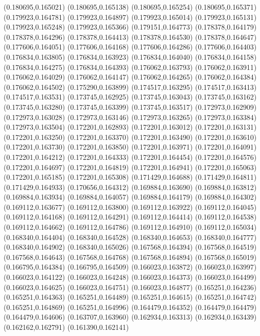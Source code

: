 (0.180695,0.165021)
(0.180695,0.165138)
(0.180695,0.165254)
(0.180695,0.165371)
(0.179923,0.164781)
(0.179923,0.164897)
(0.179923,0.165014)
(0.179923,0.165131)
(0.179923,0.165248)
(0.179923,0.165366)
(0.179151,0.164773)
(0.178378,0.164179)
(0.178378,0.164296)
(0.178378,0.164413)
(0.178378,0.164530)
(0.178378,0.164647)
(0.177606,0.164051)
(0.177606,0.164168)
(0.177606,0.164286)
(0.177606,0.164403)
(0.176834,0.163805)
(0.176834,0.163923)
(0.176834,0.164040)
(0.176834,0.164158)
(0.176834,0.164275)
(0.176834,0.164393)
(0.176062,0.163793)
(0.176062,0.163911)
(0.176062,0.164029)
(0.176062,0.164147)
(0.176062,0.164265)
(0.176062,0.164384)
(0.176062,0.164502)
(0.175290,0.163899)
(0.174517,0.163295)
(0.174517,0.163413)
(0.174517,0.163531)
(0.173745,0.162925)
(0.173745,0.163043)
(0.173745,0.163162)
(0.173745,0.163280)
(0.173745,0.163399)
(0.173745,0.163517)
(0.172973,0.162909)
(0.172973,0.163028)
(0.172973,0.163146)
(0.172973,0.163265)
(0.172973,0.163384)
(0.172973,0.163504)
(0.172201,0.162893)
(0.172201,0.163012)
(0.172201,0.163131)
(0.172201,0.163250)
(0.172201,0.163370)
(0.172201,0.163490)
(0.172201,0.163610)
(0.172201,0.163730)
(0.172201,0.163850)
(0.172201,0.163971)
(0.172201,0.164091)
(0.172201,0.164212)
(0.172201,0.164333)
(0.172201,0.164454)
(0.172201,0.164576)
(0.172201,0.164697)
(0.172201,0.164819)
(0.172201,0.164941)
(0.172201,0.165063)
(0.172201,0.165185)
(0.172201,0.165308)
(0.171429,0.164688)
(0.171429,0.164811)
(0.171429,0.164933)
(0.170656,0.164312)
(0.169884,0.163690)
(0.169884,0.163812)
(0.169884,0.163934)
(0.169884,0.164057)
(0.169884,0.164179)
(0.169884,0.164302)
(0.169112,0.163677)
(0.169112,0.163800)
(0.169112,0.163922)
(0.169112,0.164045)
(0.169112,0.164168)
(0.169112,0.164291)
(0.169112,0.164414)
(0.169112,0.164538)
(0.169112,0.164662)
(0.169112,0.164786)
(0.169112,0.164910)
(0.169112,0.165034)
(0.168340,0.164404)
(0.168340,0.164528)
(0.168340,0.164653)
(0.168340,0.164777)
(0.168340,0.164902)
(0.168340,0.165026)
(0.167568,0.164394)
(0.167568,0.164519)
(0.167568,0.164643)
(0.167568,0.164768)
(0.167568,0.164894)
(0.167568,0.165019)
(0.166795,0.164384)
(0.166795,0.164509)
(0.166023,0.163872)
(0.166023,0.163997)
(0.166023,0.164122)
(0.166023,0.164248)
(0.166023,0.164373)
(0.166023,0.164499)
(0.166023,0.164625)
(0.166023,0.164751)
(0.166023,0.164877)
(0.165251,0.164236)
(0.165251,0.164363)
(0.165251,0.164489)
(0.165251,0.164615)
(0.165251,0.164742)
(0.165251,0.164869)
(0.165251,0.164996)
(0.164479,0.164352)
(0.164479,0.164479)
(0.164479,0.164606)
(0.163707,0.163960)
(0.162934,0.163313)
(0.162934,0.163439)
(0.162162,0.162791)
(0.161390,0.162141)
